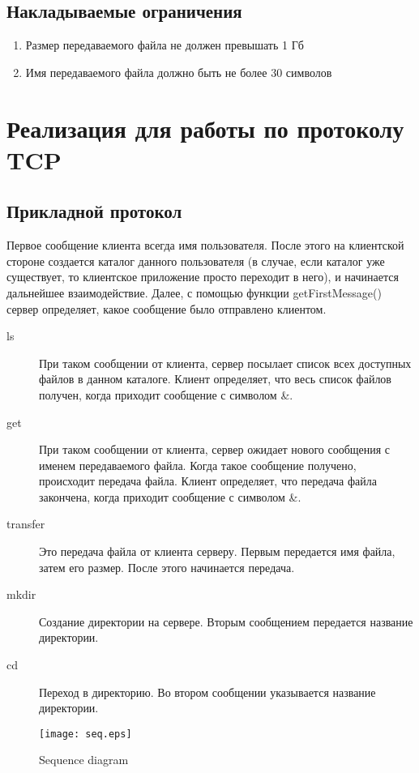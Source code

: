 \documentclass[12pt,a4paper]{report}
\begin{document}
\section{Накладываемые ограничения}
\begin{enumerate}
\item{Размер передаваемого файла не должен превышать 1 Гб}
\item{Имя передаваемого файла должно быть не более 30 символов}
\end{enumerate}

\chapter{Реализация для работы по протоколу TCP}
\section{Прикладной протокол}
\label{protocol_tcp}
	Первое сообщение клиента всегда имя пользователя. После этого на клиентской стороне создается каталог данного пользователя (в случае, если каталог уже существует, то клиентское приложение просто переходит в него), и начинается дальнейшее взаимодействие.
Далее, с помощью функции getFirstMessage() сервер определяет, какое сообщение было отправлено клиентом. 
\begin{description}
\item[ls]
При таком сообщении от клиента, сервер посылает список всех доступных файлов в данном каталоге. Клиент определяет, что весь список файлов получен, когда приходит сообщение с символом \&.
\item[get]
При таком сообщении от клиента, сервер ожидает нового сообщения с именем передаваемого файла. Когда такое сообщение получено, происходит передача файла. Клиент определяет, что передача файла закончена, когда приходит сообщение с символом \&.
\item[transfer]
Это передача файла от клиента серверу. Первым передается имя файла, затем его размер. После этого начинается передача.
\item[mkdir]
Создание директории на сервере. Вторым сообщением передается название директории.
\item[cd]
Переход в директорию. Во втором сообщении указывается название директории.
\end{description}
\begin{figure}[!htb]
\centering
\texttt{[image: seq.eps]}
\caption{Sequence diagram}
\label{fig:Sequence diagram}
\end{figure}
\end{document}
